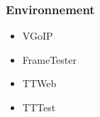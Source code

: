 \begin{frame}
    \frametitle{Environnement}
    \begin{itemize}
        \item VGoIP
        \item FrameTester
        \item TTWeb
        \item TTTest
    \end{itemize}
\end{frame}